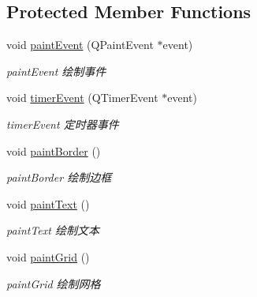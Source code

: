 \subsection*{Protected Member Functions}
\begin{DoxyCompactItemize}
\item 
void \mbox{\hyperlink{class_q_qt_led_banner_label_af4de174cc8cf737c4f0034fa9277e756}{paint\+Event}} (Q\+Paint\+Event $\ast$event)
\begin{DoxyCompactList}\small\item\em paint\+Event 绘制事件 \end{DoxyCompactList}\item 
void \mbox{\hyperlink{class_q_qt_led_banner_label_a38ca55a32878473c59f119fa675d3b02}{timer\+Event}} (Q\+Timer\+Event $\ast$event)
\begin{DoxyCompactList}\small\item\em timer\+Event 定时器事件 \end{DoxyCompactList}\item 
\mbox{\label{class_q_qt_led_banner_label_a8edd2f6a92646f289fc9e236fa0ee7d4}} 
void \mbox{\hyperlink{class_q_qt_led_banner_label_a8edd2f6a92646f289fc9e236fa0ee7d4}{paint\+Border}} ()
\begin{DoxyCompactList}\small\item\em paint\+Border 绘制边框 \end{DoxyCompactList}\item 
\mbox{\label{class_q_qt_led_banner_label_a8cb8924420a4ace28d7754e7b689eb97}} 
void \mbox{\hyperlink{class_q_qt_led_banner_label_a8cb8924420a4ace28d7754e7b689eb97}{paint\+Text}} ()
\begin{DoxyCompactList}\small\item\em paint\+Text 绘制文本 \end{DoxyCompactList}\item 
\mbox{\label{class_q_qt_led_banner_label_abf5b3c8b3393da1446faf5e797ddb84c}} 
void \mbox{\hyperlink{class_q_qt_led_banner_label_abf5b3c8b3393da1446faf5e797ddb84c}{paint\+Grid}} ()
\begin{DoxyCompactList}\small\item\em paint\+Grid 绘制网格 \end{DoxyCompactList}\end{DoxyCompactItemize}
